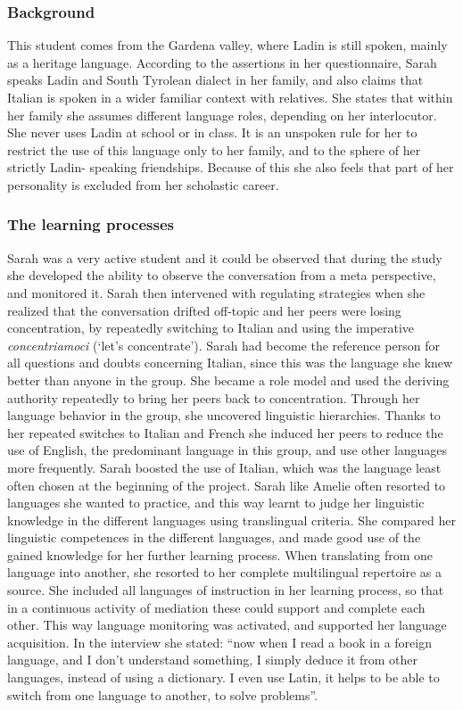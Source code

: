 \documentclass[output=paper]{../langscibook}
\begin{document}
\subsubsection{Background}

This student comes from the Gardena valley, where Ladin is still spoken, mainly as a heritage language. According to the assertions in her questionnaire, Sarah speaks Ladin and South Tyrolean dialect in her family, and also claims that Italian is spoken in a wider familiar context with relatives. She states that within her family she assumes different language roles, depending on her interlocutor. She never uses Ladin at school or in class. It is an unspoken rule for her to restrict the use of this language only to her family, and to the sphere of her strictly Ladin- speaking friendships. Because of this she also feels that part of her personality is excluded from her scholastic career.

\subsubsection{The learning processes}

Sarah was a very active student and it could be observed that during the study she developed the ability to observe the conversation from a meta perspective, and monitored it. Sarah then intervened with regulating strategies when she realized that the conversation drifted off-topic and her peers were losing concentration, by repeatedly switching to Italian and using the imperative \emph{concentriamoci} (`let’s concentrate'). Sarah had become the reference person for all questions and doubts concerning Italian, since this was the language she knew better than anyone in the group. She became a role model and used the deriving authority repeatedly to bring her peers back to concentration. Through her language behavior in the group, she uncovered linguistic hierarchies. Thanks to her repeated switches to Italian and French she induced her peers to reduce the use of English, the predominant language in this group, and use other languages more frequently. Sarah boosted the use of Italian, which was the language least often chosen at the beginning of the project. Sarah like Amelie often resorted to languages she wanted to practice, and this way learnt to judge her linguistic knowledge in the different languages using translingual criteria. She compared her linguistic competences in the different languages, and made good use of the gained knowledge for her further learning process. When translating from one language into another, she resorted to her complete multilingual repertoire as a source. She included all languages of instruction in her learning process, so that in a continuous activity of mediation these could support and complete each other. This way language monitoring was activated, and supported her language acquisition. In the interview she stated: “now when I read a book in a foreign language, and I don’t understand something, I simply deduce it from other languages, instead of using a dictionary. I even use Latin, it helps to be able to switch from one language to another, to solve problems”.
\end{document}
